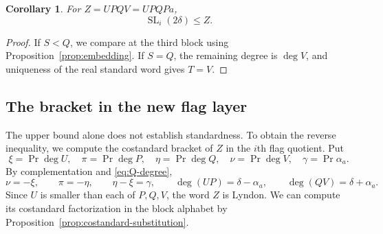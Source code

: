 \documentclass[11pt]{amsart}
\numberwithin{equation}{section}
\newtheorem{corollary}[theorem]{Corollary}
\theoremstyle{definition}
\DeclareMathOperator{\SL}{SL}
\DeclareMathOperator{\Prj}{Pr}
\begin{document}
\begin{corollary}\label{cor:two-upper}
For $Z=UPQV=UPQPa$,
\begin{equation}\label{eq:two-upper}
 \SL_i(2\delta)\leq Z.
\end{equation}
\end{corollary}
\begin{proof}
If $S<Q$, we compare at the third block using Proposition~\ref{prop:embedding}. If $S=Q$, the remaining degree is $\deg V$, and uniqueness of the real standard word gives $T=V$.
\end{proof}

\subsection{The bracket in the new flag layer}\label{subsec:bracket}

The upper bound alone does not establish standardness. To obtain the reverse inequality, we compute the costandard bracket of $Z$ in the $i$th flag quotient. Put
\[
 \xi=\Prj\deg U,\quad \pi=\Prj\deg P,
 \quad\eta=\Prj\deg Q,\quad\nu=\Prj\deg V,
 \quad\gamma=\Prj\alpha_a.
\]
By complementation and \eqref{eq:Q-degree},
\begin{equation}\label{eq:bracket-degrees}
 \nu=-\xi,\qquad \pi=-\eta,\qquad \eta-\xi=\gamma,
 \qquad \deg(UP)=\delta-\alpha_a,
 \qquad \deg(QV)=\delta+\alpha_a.
\end{equation}
Since $U$ is smaller than each of $P,Q,V$, the word $Z$ is Lyndon. We can compute its costandard factorization in the block alphabet by Proposition~\ref{prop:costandard-substitution}.
\end{document}
